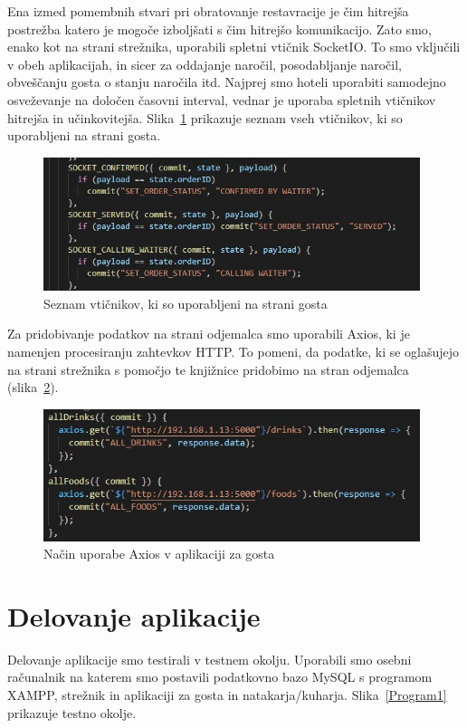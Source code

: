 \documentclass[a4paper, 12pt]{book}
\begin{document}
Ena izmed pomembnih stvari pri obratovanje restavracije je čim hitrejša postrežba katero je mogoče izboljšati s čim hitrejšo komunikacijo. Zato smo, enako kot na strani strežnika, uporabili spletni vtičnik SocketIO. To smo vključili v obeh aplikacijah, in sicer za oddajanje naročil, posodabljanje naročil, obveščanju gosta o stanju naročila itd. Najprej smo hoteli uporabiti samodejno osveževanje na določen časovni interval, vednar je uporaba spletnih vtičnikov hitrejša in učinkovitejša. Slika~\ref{socketioo1} prikazuje seznam vseh vtičnikov, ki so uporabljeni na strani gosta.

\begin{figure}[!htb]
\begin{center}
\includegraphics[width=11cm]{socketio_2.jpg}
\caption{Seznam vtičnikov, ki so uporabljeni na strani gosta}
\label{socketioo1}
\end{center}
\end{figure}

Za pridobivanje podatkov na strani odjemalca smo uporabili Axios, ki je namenjen procesiranju zahtevkov  HTTP. To pomeni, da podatke, ki se oglašujejo na strani strežnika s pomočjo te knjižnice pridobimo na stran odjemalca (slika~\ref{axios_1}). 

\begin{figure}[!htb]
\begin{center}
\includegraphics[width=11cm]{axios_1.jpg}
\caption{Način uporabe Axios v aplikaciji za gosta}
\label{axios_1}
\end{center}
\end{figure}


\chapter {Delovanje aplikacije}
Delovanje aplikacije smo testirali v testnem okolju. Uporabili smo osebni računalnik na katerem smo postavili podatkovno bazo MySQL s programom XAMPP, strežnik in aplikaciji za gosta in natakarja/kuharja. Slika~\ref{Program1} prikazuje testno okolje.
\end{document}
